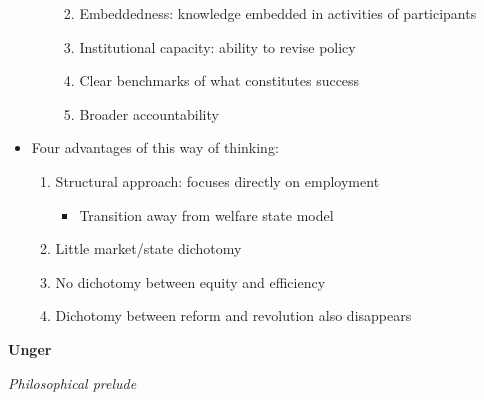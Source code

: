 \begin{itemize}
\begin{itemize}
    \begin{enumerate}
    \def\labelenumi{\arabic{enumi}.}
    \tightlist
    \item
      Embeddedness: knowledge embedded in activities of participants
    \item
      Institutional capacity: ability to revise policy
    \item
      Clear benchmarks of what constitutes success
    \item
      Broader accountability
    \end{enumerate}
  \end{itemize}
\item
  Four advantages of this way of thinking:

  \begin{enumerate}
  \def\labelenumi{\arabic{enumi}.}
  \tightlist
  \item
    Structural approach: focuses directly on employment

    \begin{itemize}
    \tightlist
    \item
      Transition away from welfare state model
    \end{itemize}
  \item
    Little market/state dichotomy
  \item
    No dichotomy between equity and efficiency
  \item
    Dichotomy between reform and revolution also disappears
  \end{enumerate}
\end{itemize}

\textbf{Unger}

\emph{Philosophical prelude}

